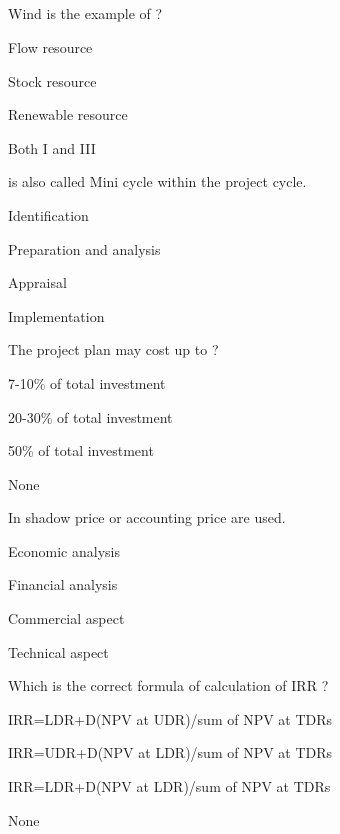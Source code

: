 
\subsection*{}

\begin{questions}

\question Wind is the example of \fillin[][3cm] ?
\begin{items}
\item Flow resource
\item Stock resource
\item Renewable resource
\item* Both I and III
\end{items}

\question \fillin[][3cm] is also called Mini cycle within the project cycle.
\begin{items}
\item Identification
\item Preparation and analysis
\item Appraisal
\item* Implementation
\end{items}

\question The project plan may cost up to \fillin[][3cm]?
\begin{items}
\item 7-10\% of total investment
\item 20-30\% of total investment
\item 50\% of total investment
\item None
\end{items}

\question In \fillin[][3cm] shadow price or accounting price are used.
\begin{items}
\item Economic analysis
\item Financial analysis
\item Commercial aspect
\item Technical aspect
\end{items}

\question Which is the correct formula of calculation of IRR ?
\begin{items}
\item IRR=LDR+D(NPV at UDR)/sum of NPV at TDRs
\item IRR=UDR+D(NPV at LDR)/sum of NPV at TDRs
\item IRR=LDR+D(NPV at LDR)/sum of NPV at TDRs
\item None
\end{items}


\end{questions}
